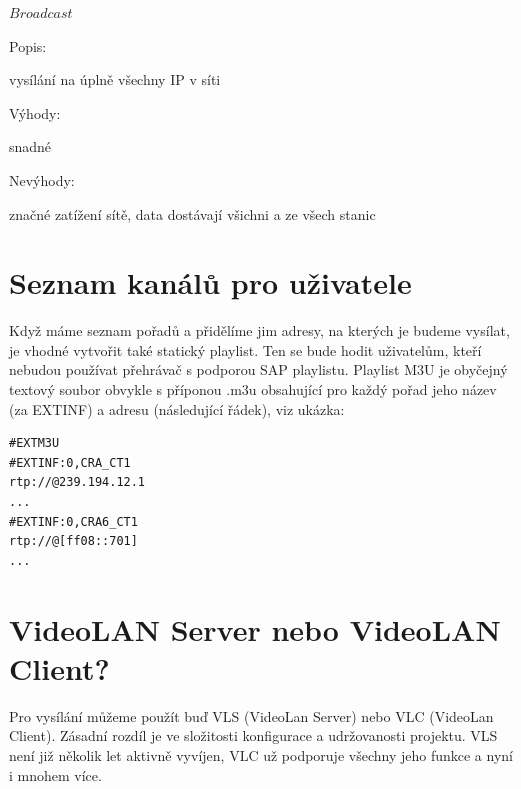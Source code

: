 \vspace{10pt}

\begin{bf}$Broadcast$\end{bf}
   

\begin{bf}Popis:\end{bf} vysílání na úplně všechny IP v síti
 

\begin{bf}Výhody:\end{bf} snadné


\begin{bf}Nevýhody:\end{bf} značné zatížení sítě, data dostávají všichni a ze všech stanic

\vspace{10pt}

\section{Seznam kanálů pro uživatele}

Když máme seznam pořadů a přidělíme jim adresy, na kterých je budeme vysílat, je vhodné vytvořit také statický playlist. Ten se bude hodit uživatelům, kteří nebudou používat přehrávač s podporou SAP playlistu. Playlist M3U je obyčejný textový soubor obvykle s příponou .m3u obsahující pro každý pořad jeho název (za EXTINF) a adresu (následující řádek), viz ukázka:

\vspace{10pt}

\begin{small}
\begin{verbatim}
#EXTM3U
#EXTINF:0,CRA_CT1
rtp://@239.194.12.1
...
#EXTINF:0,CRA6_CT1
rtp://@[ff08::701]
...
\end{verbatim}
\end{small}

\vspace{10pt}

\section{VideoLAN Server nebo VideoLAN Client?}

Pro vysílání můžeme použít buď VLS (VideoLan Server) nebo VLC (VideoLan Client). Zásadní rozdíl je ve složitosti konfigurace a udržovanosti projektu. VLS není již několik let aktivně vyvíjen, VLC už podporuje všechny jeho funkce a nyní i mnohem více.

